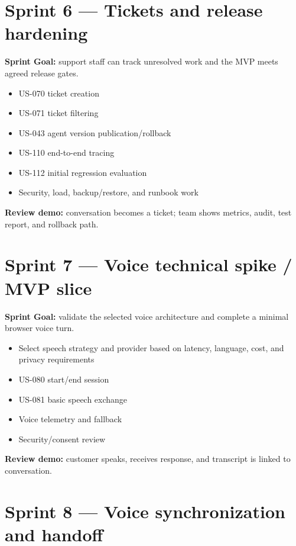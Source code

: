 \section{Sprint 6 --- Tickets and release hardening}

\textbf{Sprint Goal:} support staff can track unresolved work and the MVP meets agreed release gates.

\begin{itemize}
\item US-070 ticket creation
\item US-071 ticket filtering
\item US-043 agent version publication/rollback
\item US-110 end-to-end tracing
\item US-112 initial regression evaluation
\item Security, load, backup/restore, and runbook work
\end{itemize}
\textbf{Review demo:} conversation becomes a ticket; team shows metrics, audit, test report, and rollback path.



\section{Sprint 7 --- Voice technical spike / MVP slice}

\textbf{Sprint Goal:} validate the selected voice architecture and complete a minimal browser voice turn.

\begin{itemize}
\item Select speech strategy and provider based on latency, language, cost, and privacy requirements
\item US-080 start/end session
\item US-081 basic speech exchange
\item Voice telemetry and fallback
\item Security/consent review
\end{itemize}
\textbf{Review demo:} customer speaks, receives response, and transcript is linked to conversation.



\section{Sprint 8 --- Voice synchronization and handoff}

